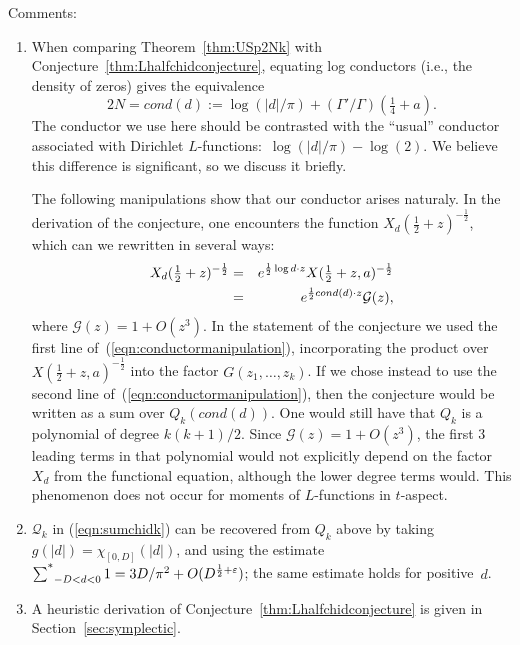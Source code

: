 \documentclass[12pt,letterpaper]{amsart}
\theoremstyle{plain}
\theoremstyle{definition}
\theoremstyle{remark}
\numberwithin{equation}{subsection}
\numberwithin{theorem}{subsection}
\numberwithin{table}{subsection}
\def\sumstar{\operatornamewithlimits{\sum\nolimits^*}}
\begin{document}
Comments:
\begin{enumerate}

\item When comparing Theorem~\ref{thm:USp2Nk} with 
Conjecture~\ref{thm:Lhalfchidconjecture}, equating log conductors
(i.e., the density of zeros) gives
the equivalence 
\begin{equation}
2 N= cond(d):=\log ({|d|}/\pi) +(\Gamma'/\Gamma)(\tfrac14+a).
\end{equation}
The conductor we use here should be contrasted with the ``usual''
conductor associated with Dirichlet $L$-functions:~$\log(|d|/\pi)-\log(2)$. 
We believe this difference is significant, so we discuss it briefly.

The following
manipulations show that our conductor arises naturaly.  
In the derivation of the conjecture, one encounters
the function $X_d(\frac12+z)^{-\frac12}$, which can we rewritten in
several ways:
\begin{eqnarray}\label{eqn:conductormanipulation}
X_d(\tfrac12+z)^{-\frac12} &=& e^{\frac12 \log d \cdot z }
X(\tfrac12+z,a)^{-\frac12} \cr
&=& e^{\frac12 cond(d) \cdot z } \mathcal{G}(z) ,
\end{eqnarray}
where $\mathcal{G}(z)=1+O(z^3)$.  In the statement of the conjecture we 
used the first line of~(\ref{eqn:conductormanipulation}), 
incorporating the product over 
$X(\tfrac12+z,a)^{-\frac12}$ into the factor $G(z_1,\ldots,z_k)$.
If we chose instead to use the second line 
of~(\ref{eqn:conductormanipulation}), then the conjecture
would be written as a sum over $Q_k(cond(d))$.
One would still have that $Q_k$ is a polynomial of degree $k(k+1)/2$.
Since $\mathcal{G}(z)=1+O(z^3)$, the first $3$ leading terms
in that polynomial would not explicitly depend on the factor 
$X_d$ from the functional equation, although the lower degree terms would.
This phenomenon does not occur for moments of $L$-functions
in $t$-aspect.


\item $\mathcal{Q}_k$ in (\ref{eqn:sumchidk}) can be recovered from $Q_k$ above
by taking $g(|d|)= \chi_{[0,D]}(|d|)$, and using the estimate
$\sumstar_{-D<d<0} 1 = 3D/\pi^2 +O(D^{\frac12  +\varepsilon})$; the same
estimate holds for positive~$d$.

\item A heuristic derivation of Conjecture~\ref{thm:Lhalfchidconjecture} is given in
Section~\ref{sec:symplectic}. 


\end{enumerate}
\end{document}
